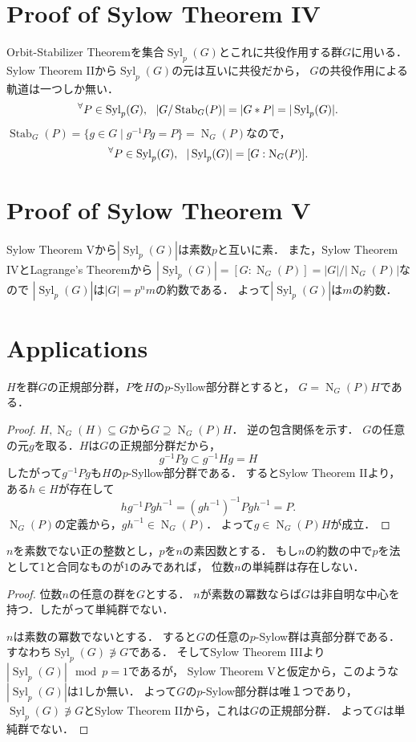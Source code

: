 \documentclass[a4paper]{jsarticle}
\newcommand{\Stab}{\operatorname{Stab}}
\newcommand{\Norm}{\operatorname{N}}
\newcommand{\Syl}{\operatorname{Syl}}
\begin{document}
    \section{Proof of Sylow Theorem IV}
    Orbit-Stabilizer Theoremを集合$\Syl_p(G)$とこれに共役作用する群$G$に用いる．
    Sylow Theorem IIから$\Syl_p(G)$の元は互いに共役だから，
    $G$の共役作用による軌道は一つしか無い．
    \[ \Forall{P \in \Syl_p(G)} |G/\Stab_G(P)|=|G \ast P|=|\Syl_p(G)|. \]
    $\Stab_G(P)=\{ g \in G \mid g^{-1}Pg=P \}=\Norm_G(P)$なので，
    \[ \Forall{P \in \Syl_p(G)} |\Syl_p(G)|=[G:\Norm_G(P)]. \]

    \section{Proof of Sylow Theorem V}
    Sylow Theorem Vから$|\Syl_p(G)|$は素数$p$と互いに素．
    また，Sylow Theorem IVとLagrange's Theoremから
    $|\Syl_p(G)|=[G:\Norm_G(P)]=|G|/|\Norm_G(P)|$なので
    $|\Syl_p(G)|$は$|G|=p^n m$の約数である．
    よって$|\Syl_p(G)|$は$m$の約数．

    \section{Applications}
    \begin{Lemma}
        $H$を群$G$の正規部分群，$P$を$H$の$p$-Syllow部分群とすると，
        $G=\Norm_G(P)H$である．
    \end{Lemma}
    \begin{proof}
        $H,\Norm_G(H) \subseteq G$から$G \supseteq \Norm_G(P)H$．
        逆の包含関係を示す．
        $G$の任意の元$g$を取る．$H$は$G$の正規部分群だから，
        \[ g^{-1}Pg \subset g^{-1}Hg=H \]
        したがって$g^{-1}Pg$も$H$の$p$-Syllow部分群である．
        するとSylow Theorem IIより，ある$h \in H$が存在して
        \[ hg^{-1} P gh^{-1} = (gh^{-1})^{-1} P gh^{-1} = P. \]
        $\Norm_G(P)$の定義から，$gh^{-1} \in \Norm_G(P)$．
        よって$g \in \Norm_G(P)H$が成立．
    \end{proof}

    \begin{Prop}
        $n$を素数でない正の整数とし，$p$を$n$の素因数とする．
        もし$n$の約数の中で$p$を法として1と合同なものが$1$のみであれば，
        位数$n$の単純群は存在しない．
    \end{Prop}
    \begin{proof}
        位数$n$の任意の群を$G$とする．
        $n$が素数の冪数ならば$G$は非自明な中心を持つ．したがって単純群でない．

        $n$は素数の冪数でないとする．
        すると$G$の任意の$p$-Sylow群は真部分群である．すなわち$\Syl_p(G) \not \ni G$である．
        そしてSylow Theorem IIIより$|\Syl_p(G)| \mod p=1$であるが，
        Sylow Theorem Vと仮定から，このような$|\Syl_p(G)|$は1しか無い．
        よって$G$の$p$-Sylow部分群は唯１つであり，
        $\Syl_p(G) \not \ni G$とSylow Theorem IIから，これは$G$の正規部分群．
        よって$G$は単純群でない．
    \end{proof}
\end{document}

